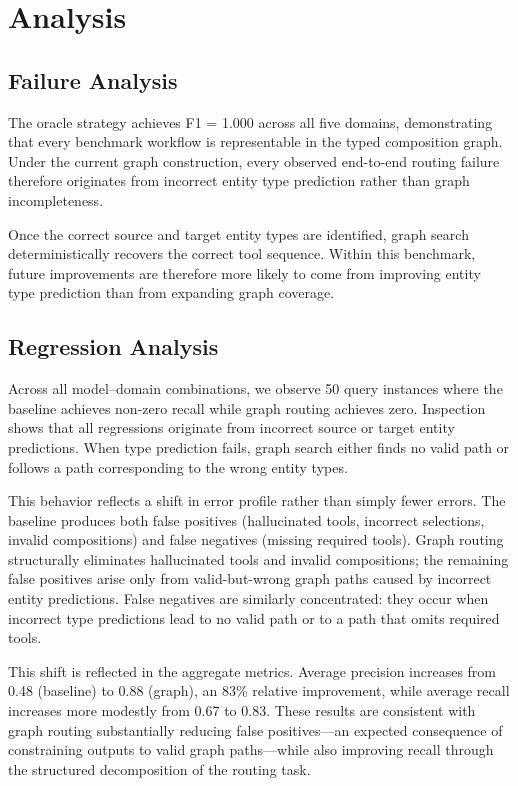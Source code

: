 \section{Analysis}
\label{sec:analysis}

\subsection{Failure Analysis}
\label{sec:failure-analysis}

The oracle strategy achieves F1 = 1.000 across all five domains, demonstrating that every benchmark workflow is representable in the typed composition graph.
Under the current graph construction, every observed end-to-end routing failure therefore originates from incorrect entity type prediction rather than graph incompleteness.

Once the correct source and target entity types are identified, graph search deterministically recovers the correct tool sequence.
Within this benchmark, future improvements are therefore more likely to come from improving entity type prediction than from expanding graph coverage.

\subsection{Regression Analysis}
\label{sec:regressions}

Across all model--domain combinations, we observe 50 query instances where the baseline achieves non-zero recall while graph routing achieves zero.
Inspection shows that all regressions originate from incorrect source or target entity predictions.
When type prediction fails, graph search either finds no valid path or follows a path corresponding to the wrong entity types.

This behavior reflects a shift in error profile rather than simply fewer errors.
The baseline produces both false positives (hallucinated tools, incorrect selections, invalid compositions) and false negatives (missing required tools).
Graph routing structurally eliminates hallucinated tools and invalid compositions; the remaining false positives arise only from valid-but-wrong graph paths caused by incorrect entity predictions.
False negatives are similarly concentrated: they occur when incorrect type predictions lead to no valid path or to a path that omits required tools.

This shift is reflected in the aggregate metrics.
Average precision increases from 0.48 (baseline) to 0.88 (graph), an 83\% relative improvement, while average recall increases more modestly from 0.67 to 0.83.
These results are consistent with graph routing substantially reducing false positives---an expected consequence of constraining outputs to valid graph paths---while also improving recall through the structured decomposition of the routing task.

